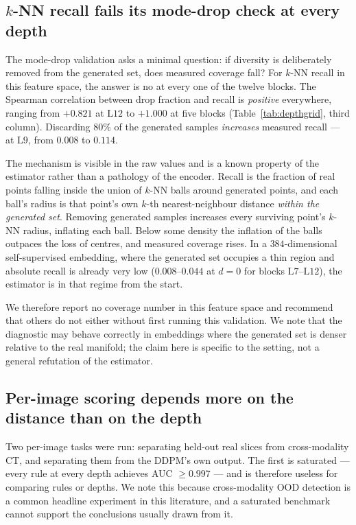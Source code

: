 \documentclass[preprint,12pt,authoryear]{elsarticle}
\newcommand{\Lb}[1]{\ensuremath{\mathrm{L}#1}}
\begin{document}
\subsection{$k$-NN recall fails its mode-drop check at every depth}
\label{sec:res_coverage}

The mode-drop validation asks a minimal question: if diversity is deliberately
removed from the generated set, does measured coverage fall? For $k$-NN recall
\citep{kynkaanniemi2019pr} in this feature space, the answer is no at
every one of the twelve blocks. The Spearman correlation between drop fraction
and recall is \emph{positive} everywhere, ranging from $+0.821$ at \Lb{12} to
$+1.000$ at five blocks (Table~\ref{tab:depthgrid}, third column). Discarding
$80\%$ of the generated samples \emph{increases} measured recall --- at \Lb{9},
from $0.008$ to $0.114$.

The mechanism is visible in the raw values and is a known property of the
estimator rather than a pathology of the encoder. Recall is the fraction of real
points falling inside the union of $k$-NN balls around generated points, and
each ball's radius is that point's own $k$-th nearest-neighbour distance
\emph{within the generated set}. Removing generated samples increases every
surviving point's $k$-NN radius, inflating each ball. Below some density the
inflation of the balls outpaces the loss of centres, and measured coverage
rises. In a $384$-dimensional self-supervised embedding, where the generated set
occupies a thin region and absolute recall is already very low ($0.008$--$0.044$
at $d = 0$ for blocks \Lb{7}--\Lb{12}), the estimator is in that regime from the
start.

We therefore report no coverage number in this feature space and recommend that
others do not either without first running this validation. We note that the
diagnostic may behave correctly in embeddings where the generated set is denser
relative to the real manifold; the claim here is specific to the setting, not a
general refutation of the estimator.

\subsection{Per-image scoring depends more on the distance than on the depth}
\label{sec:res_perimage}

Two per-image tasks were run: separating held-out real slices from
cross-modality CT, and separating them from the DDPM's own output. The first is
saturated --- every rule at every depth achieves AUC $\ge 0.997$ --- and is
therefore useless for comparing rules or depths. We note this because
cross-modality OOD detection is a common headline experiment in this
literature, and a saturated benchmark cannot support the conclusions usually
drawn from it.
\end{document}
